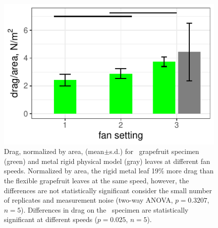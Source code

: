 \begin{figure}[p]
\begin{center}
\includegraphics{data/results2.pdf}
%
\end{center}
\caption{Drag, normalized by area, (mean$\pm$s.d.) for \Cxparadisi\ grapefruit specimen (green) and metal rigid physical model (gray) leaves at different fan speeds. Normalized by area, the rigid metal leaf 19\% more drag than the flexible grapefruit leaves at the same speed, however, the differences are not statistically significant consider the small number of replicates and measurement noise (two-way ANOVA, $p=0.3207$, $n=5$). Differences in drag on the \Cxparadisi\ specimen are statistically significant at different speeds ($p=0.025$, $n=5$).}
\label{fig:results:dragarea}
\end{figure}

